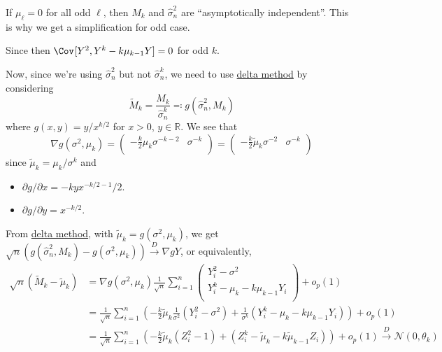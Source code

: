 \begin{remark}
	If \(\mu _{\ell } = 0\) for all odd \(\ell \), then \(M_k\) and \(\hat{\sigma} _n^2\) are ``asymptotically independent''. This is why we get a simplification for odd case.
\end{remark}
\begin{explanation}
	Since then \(\Cov_{}[Y^2 , Y^k - k \mu _{k-1} Y] = 0\) for odd \(k\).
\end{explanation}

Now, since we're using \(\hat{\sigma} _n^2\) but not \(\hat{\sigma} _n^k\), we need to use \hyperref[thm:delta-method]{delta method} by considering
\[
	\widetilde{M} _k
	= \frac{M_k}{\hat{\sigma} _n^k}
	\eqqcolon g(\hat{\sigma} _n^2, M_k)
\]
where \(g(x, y) = y / x^{k / 2}\) for \(x > 0\), \(y \in \mathbb{R} \). We see that
\[
	\nabla g(\sigma ^2, \mu _k)
	= \begin{pmatrix}
		-\frac{k}{2} \mu _k \sigma ^{-k - 2} & \sigma ^{-k} \\
	\end{pmatrix}
	= \begin{pmatrix}
		-\frac{k}{2} \widetilde{\mu} _k \sigma ^{-2} & \sigma ^{-k} \\
	\end{pmatrix}
\]
since \(\widetilde{\mu} _k = \mu _k / \sigma ^k\) and
\begin{itemize}
	\item \(\partial g / \partial x = - k y x^{-k / 2 - 1} / 2\).
	\item \(\partial g / \partial y = x^{-k / 2}\).
\end{itemize}
From \hyperref[thm:delta-method]{delta method}, with \(\widetilde{\mu} _k = g(\sigma ^2, \mu _k)\), we get \(\sqrt{n} (g(\hat{\sigma} _n^2, M_k) - g(\sigma ^2, \mu _k)) \overset{D}{\to } \nabla g Y\), or equivalently,
\[
	\begin{split}
		\sqrt{n} (\widetilde{M} _k - \widetilde{\mu} _k)
		 & = \nabla g(\sigma ^2, \mu _k) \frac{1}{\sqrt{n} } \sum_{i=1}^{n} \begin{pmatrix}
			                                                                    Y_i^2 - \sigma ^2                 \\
			                                                                    Y_i^k - \mu _k - k \mu _{k-1} Y_i \\
		                                                                    \end{pmatrix} + o_p(1)                                                                                             \\
		 & = \frac{1}{\sqrt{n} } \sum_{i=1}^{n} \left( -\frac{k}{2} \widetilde{\mu} _k \frac{1}{\sigma ^2} (Y_i^2 - \sigma ^2) + \frac{1}{\sigma ^k} (Y_i^k - \mu _k - k \mu _{k-1} Y_i) \right) + o_p(1) \\
		 & = \frac{1}{\sqrt{n} } \sum_{i=1}^{n} \left( -\frac{k}{2} \widetilde{\mu} _k (Z_i^2 - 1) + (Z_i^k - \widetilde{\mu} _k - k \widetilde{\mu} _{k-1} Z_i ) \right) + o_p(1)
		\overset{D}{\to} \mathcal{N} (0, \theta_k)
	\end{split}
\]
